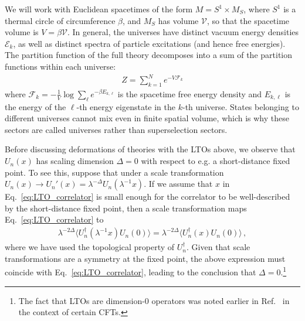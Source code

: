 \documentclass[11pt]{article}
\begin{document}
We will work with Euclidean spacetimes of the form $M = S^1 \times M_S$, where
$S^1$ is a thermal circle of circumference $\beta$, and $M_S$ has volume
$\mathcal{V}$, so that the spacetime volume is $V = \beta \mathcal{V}$. In
general, the universes have distinct vacuum energy densities $\mathcal{E}_k$, as
well as distinct spectra of particle excitations (and hence free energies). The
partition function of the full theory decomposes into a sum of the partition
functions within each universe:
\begin{align}
Z = \sum_{k=1}^{N} e^{-V \mathcal{F}_k}
\end{align}
where $\mathcal{F}_k = - \frac{1}{V} \log \sum\limits_{\ell} e^{-\beta E_{k,\ell}}$ is the spacetime free energy density and $E_{k,\ell}$ is the
energy of the $\ell$-th energy eigenstate in the $k$-th universe.  States
belonging to different universes cannot mix even in finite spatial volume, which
is why these sectors are called universes rather than superselection sectors. 

Before discussing deformations of theories with the LTOs above,  we observe that $U_n(x)$ has scaling dimension $\Delta = 0$ with respect
to e.g. a short-distance fixed point.  To see this, suppose that under a scale transformation $U_{n}(x) \to U_n'(x) = \lambda^{-\Delta}U_n( \lambda^{-1} x)$.
If we assume that $x$ in
Eq.~\eqref{eq:LTO_correlator} is small enough for the correlator to be well-described by the short-distance fixed point,
then a scale transformation maps Eq.~\eqref{eq:LTO_correlator} to
\begin{align}
    \lambda^{-2\Delta} \langle U_{n}^{\dag}(\lambda^{-1} x) U_{n}(0) \rangle  = \lambda^{-2\Delta} \langle U_{n}^{\dag}(x) U_{n}(0) \rangle\,,
\end{align}
where we have used the topological property of $U_n^\dagger$. Given that scale
transformations are a symmetry at the fixed point, the above expression must
coincide with Eq.~\eqref{eq:LTO_correlator}, leading to the conclusion that
$\Delta = 0$.\footnote{The fact that LTOs are dimension-$0$ operators was noted earlier in Ref.~\cite{Hellerman:2006zs} in the context of certain CFTs.}
\end{document}
